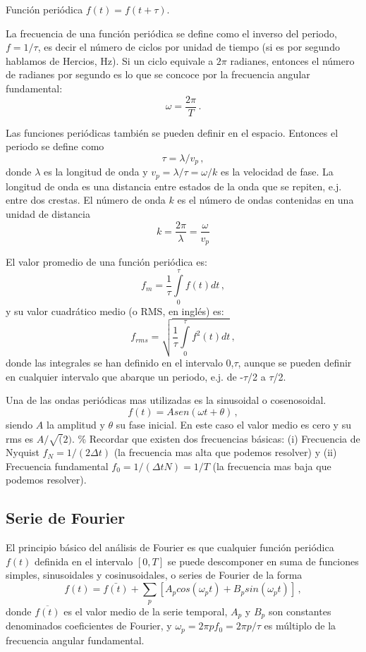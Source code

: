 \documentclass[
]{agujournal2019}
\begin{document}
\begin{center}
\end{center}
\begin{center}
Función periódica $f(t)=f(t+\tau)$.
\end{center}

La frecuencia de una función periódica se define como el inverso del
periodo, \(f=1/\tau\), es decir el número de ciclos por unidad de tiempo
(si es por segundo hablamos de Hercios, Hz). Si un ciclo equivale a
\(2\pi\) radianes, entonces el número de radianes por segundo es lo que
se concoce por la frecuencia angular fundamental:
\[\omega=\frac{2\pi}{T}\,.\]

Las funciones periódicas también se pueden definir en el espacio.
Entonces el periodo se define como \[\tau=\lambda/v_p\,,\] donde
\(\lambda\) es la longitud de onda y \(v_p=\lambda/\tau=\omega/k\) es la
velocidad de fase. La longitud de onda es una distancia entre estados de
la onda que se repiten, e.j. entre dos crestas. El número de onda \(k\)
es el número de ondas contenidas en una unidad de distancia
\[k=\frac{2\pi}{\lambda}=\frac{\omega}{v_p}\]

El valor promedio de una función periódica es:
\[f_m=\frac{1}{\tau}\int\limits^{\tau}_0 f(t) dt\,,\] y su valor
cuadrático medio (o RMS, en inglés) es:
\[f_{rms}=\sqrt{\frac{1}{\tau}\int\limits^{\tau}_0 f^2(t) dt}\,,\] donde
las integrales se han definido en el intervalo 0,\(\tau\), aunque se
pueden definir en cualquier intervalo que abarque un periodo, e.j. de
-\(\tau\)/2 a \(\tau\)/2.

Una de las ondas periódicas mas utilizadas es la sinusoidal o
cosenosoidal. \[f(t)=A sen(\omega t + \theta)\,,\] siendo \(A\) la
amplitud y \(\theta\) su fase inicial. En este caso el valor medio es
cero y su rms es \(A/\sqrt(2)\). \% Recordar que existen dos frecuencias
básicas: (i) Frecuencia de Nyquist \(f_N=1/(2\Delta t)\) (la frecuencia
mas alta que podemos resolver) y (ii) Frecuencia fundamental
\(f_0=1/(\Delta t N)=1/T\) (la frecuencia mas baja que podemos
resolver).

\vspace{0.25cm}
\subsection{Serie de Fourier}

El principio básico del análisis de Fourier es que cualquier función
periódica \(f(t)\) definida en el intervalo \([0,T]\) se puede
descomponer en suma de funciones simples, sinusoidales y cosinusoidales,
o series de Fourier de la forma
\[f(t)=\bar{f(t)} + \sum\limits_p [A_p cos(\omega_p t) + B_p sin (\omega_p t)]\,,\]
donde \(\overline{f(t)}\) es el valor medio de la serie temporal,
\(A_p\) y \(B_p\) son constantes denominados coeficientes de Fourier, y
\(\omega_p=2 \pi p f_0=2\pi p/\tau\) es múltiplo de la frecuencia
angular fundamental.
\end{document}
